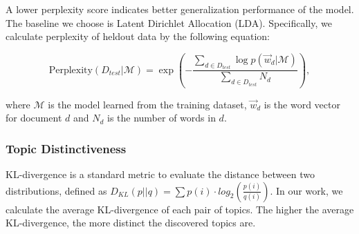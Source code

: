 A lower perplexity score indicates better generalization performance of the model. The baseline we choose is Latent Dirichlet Allocation (LDA). Specifically, we calculate perplexity of heldout data by the following equation:

\vspace{-1mm}

\begin{equation}
	\textrm{Perplexity}({D}_{test}|\mathcal{M})=\exp(-\frac{{\sum}_{d\in D_{test}} \log p(\overrightarrow{w}_{d}|\mathcal{M})}{{\sum}_{d\in D_{test}} N_d}),
\end{equation}

\noindent where $\mathcal{M}$ is the model learned from the training dataset, $\overrightarrow{w}_{d}$ is the word vector for document $d$ and $N_d$ is the number of words in $d$.

\subsubsection{Topic Distinctiveness}


KL-divergence is a standard metric to evaluate the distance between two distributions, defined as $D_{KL}(p||q) = \sum{p(i) \cdot log_2(\frac{p(i)}{q(i)})}$. In our work, we calculate the average KL-divergence of each pair of topics. The higher the average KL-divergence, the more distinct the discovered topics are.

